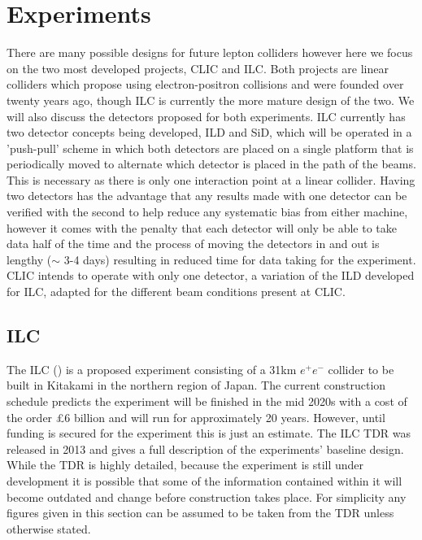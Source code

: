 \chapter{Experiments}


There are many possible designs for future lepton colliders \cite{Lipton:2012du,Koratzinos:2014cla} however here we focus on the two most developed projects, \ac{CLIC} and \ac{ILC}. Both projects are linear colliders which propose using electron-positron collisions and were founded over twenty years ago, though \ac{ILC} is currently the more mature design of the two. We will also discuss the detectors proposed for both experiments. \ac{ILC} currently has two detector concepts being developed, \ac{ILD} and \ac{SiD}, which will be operated in a 'push-pull' scheme in which both detectors are placed on a single platform that is periodically moved to alternate which detector is placed in the path of the beams. This is necessary as there is only one interaction point at a linear collider. Having two detectors has the advantage that any results made with one detector can be verified with the second to help reduce any systematic bias from either machine, however it comes with the penalty that each detector will only be able to take data half of the time and the process of moving the detectors in and out is lengthy ($\sim$ 3-4 days) resulting in reduced time for data taking for the experiment. \ac{CLIC} intends to operate with only one detector, a variation of the \ac{ILD} developed for \ac{ILC}, adapted for the different beam conditions present at CLIC. 

\section{ILC}

The ILC () is a proposed experiment consisting of a 31km ${e^+e^-}$ collider to be built in Kitakami in the northern region of Japan. The current construction schedule predicts the experiment will be finished in the mid 2020s with a cost of the order \pounds6 billion and will run for approximately 20 years. However, until funding is secured for the experiment this is just an estimate. The \ac{ILC} \ac{TDR} \cite{ILCTDR} was released in 2013 and gives a full description of the experiments' baseline design. While the \ac{TDR} is highly detailed, because the experiment is still under development it is possible that some of the information contained within it will become outdated and change before construction takes place. For simplicity any figures given in this section can be assumed to be taken from the \ac{TDR} unless otherwise stated.

